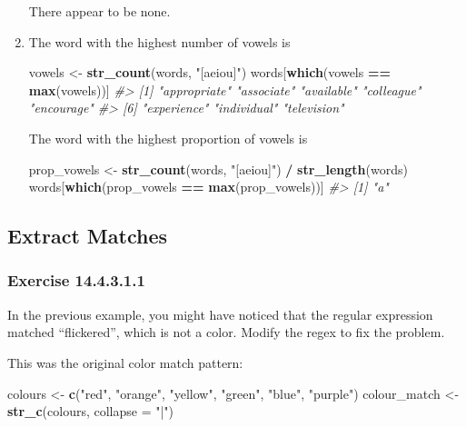 \documentclass[]{book}
\newenvironment{Shaded}{\begin{snugshade}}{\end{snugshade}}
\newcommand{\CommentTok}[1]{\textcolor[rgb]{0.56,0.35,0.01}{\textit{#1}}}
\newcommand{\DataTypeTok}[1]{\textcolor[rgb]{0.13,0.29,0.53}{#1}}
\newcommand{\KeywordTok}[1]{\textcolor[rgb]{0.13,0.29,0.53}{\textbf{#1}}}
\newcommand{\NormalTok}[1]{#1}
\newcommand{\OperatorTok}[1]{\textcolor[rgb]{0.81,0.36,0.00}{\textbf{#1}}}
\newcommand{\StringTok}[1]{\textcolor[rgb]{0.31,0.60,0.02}{#1}}
\theoremstyle{plain}
\theoremstyle{remark}
\begin{document}
\begin{enumerate}
  There appear to be none.
\item
  The word with the highest number of vowels is

\begin{Shaded}
\begin{Highlighting}[]
\NormalTok{vowels <-}\StringTok{ }\KeywordTok{str_count}\NormalTok{(words, }\StringTok{"[aeiou]"}\NormalTok{)}
\NormalTok{words[}\KeywordTok{which}\NormalTok{(vowels }\OperatorTok{==}\StringTok{ }\KeywordTok{max}\NormalTok{(vowels))]}
\CommentTok{#> [1] "appropriate" "associate"   "available"   "colleague"   "encourage"  }
\CommentTok{#> [6] "experience"  "individual"  "television"}
\end{Highlighting}
\end{Shaded}

  The word with the highest proportion of vowels is

\begin{Shaded}
\begin{Highlighting}[]
\NormalTok{prop_vowels <-}\StringTok{ }\KeywordTok{str_count}\NormalTok{(words, }\StringTok{"[aeiou]"}\NormalTok{) }\OperatorTok{/}\StringTok{ }\KeywordTok{str_length}\NormalTok{(words)}
\NormalTok{words[}\KeywordTok{which}\NormalTok{(prop_vowels }\OperatorTok{==}\StringTok{ }\KeywordTok{max}\NormalTok{(prop_vowels))]}
\CommentTok{#> [1] "a"}
\end{Highlighting}
\end{Shaded}
\end{enumerate}

\hypertarget{extract-matches}{%
\subsection{Extract Matches}\label{extract-matches}}

\hypertarget{exercise-14.4.3.1.1}{%
\subsubsection*{\texorpdfstring{Exercise
{14.4.3.1.1}}{Exercise 14.4.3.1.1}}\label{exercise-14.4.3.1.1}}

In the previous example, you might have noticed that the regular
expression matched ``flickered'', which is not a color. Modify the regex
to fix the problem.

This was the original color match pattern:

\begin{Shaded}
\begin{Highlighting}[]
\NormalTok{colours <-}\StringTok{ }\KeywordTok{c}\NormalTok{(}\StringTok{"red"}\NormalTok{, }\StringTok{"orange"}\NormalTok{, }\StringTok{"yellow"}\NormalTok{, }\StringTok{"green"}\NormalTok{, }\StringTok{"blue"}\NormalTok{, }\StringTok{"purple"}\NormalTok{)}
\NormalTok{colour_match <-}\StringTok{ }\KeywordTok{str_c}\NormalTok{(colours, }\DataTypeTok{collapse =} \StringTok{"|"}\NormalTok{)}
\end{Highlighting}
\end{Shaded}
\end{document}
